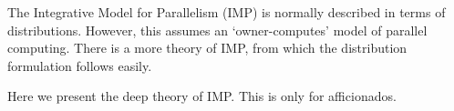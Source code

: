 The Integrative Model for Parallelism (IMP) is normally described
in terms of distributions. However, this assumes an `owner-computes' model
of parallel computing. There is a more theory of IMP,
from which the distribution formulation follows easily.

Here we present the deep theory of IMP. This is only for afficionados.

